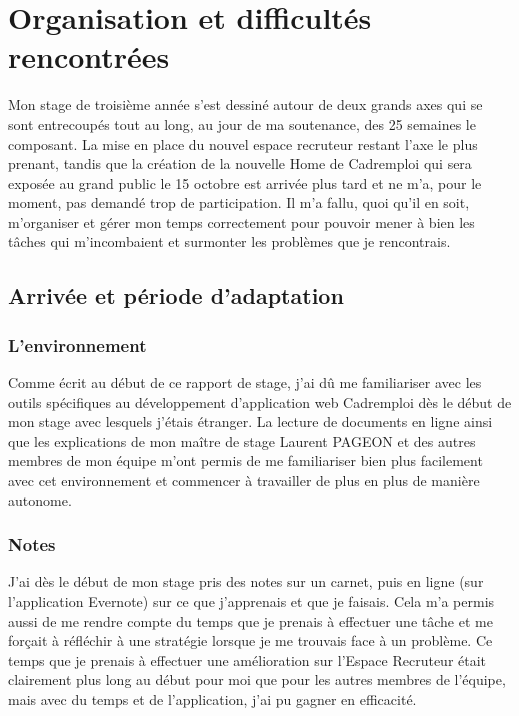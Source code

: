 
\chapter{Organisation et difficultés rencontrées} %

\label{difficultes} %


Mon stage de troisième année s'est dessiné autour de deux grands axes qui se sont entrecoupés tout au long, au jour de ma soutenance, des 25 semaines le composant.
La mise en place du nouvel espace recruteur restant l'axe le plus prenant, tandis que la création de la nouvelle Home de Cadremploi qui sera exposée au grand public le 15 octobre est arrivée plus tard et ne m'a, pour le moment, pas demandé trop de participation.
Il m'a fallu, quoi qu'il en soit, m'organiser et gérer mon temps correctement pour pouvoir mener à bien les tâches qui m'incombaient et surmonter les problèmes que je rencontrais.

\section{Arrivée et période d'adaptation}
\subsection{L'environnement}
Comme écrit au début de ce rapport de stage, j'ai dû me familiariser avec les outils spécifiques au développement d'application web Cadremploi dès le début de mon stage avec lesquels j'étais étranger.
La lecture de documents en ligne ainsi que les explications de mon maître de stage Laurent PAGEON et des autres membres de mon équipe m'ont permis de me familiariser bien plus facilement avec cet environnement et commencer à travailler de plus en plus de manière autonome.
\subsection{Notes}
J'ai dès le début de mon stage pris des notes sur un carnet, puis en ligne (sur l'application Evernote) sur ce que j'apprenais et que je faisais.
Cela m'a permis aussi de me rendre compte du temps que je prenais à effectuer une tâche et me forçait à réfléchir à une stratégie lorsque je me trouvais face à un problème.
Ce temps que je prenais à effectuer une amélioration sur l'Espace Recruteur était clairement plus long au début pour moi que pour les autres membres de l'équipe, mais avec du temps et de l'application, j'ai pu gagner en efficacité.
